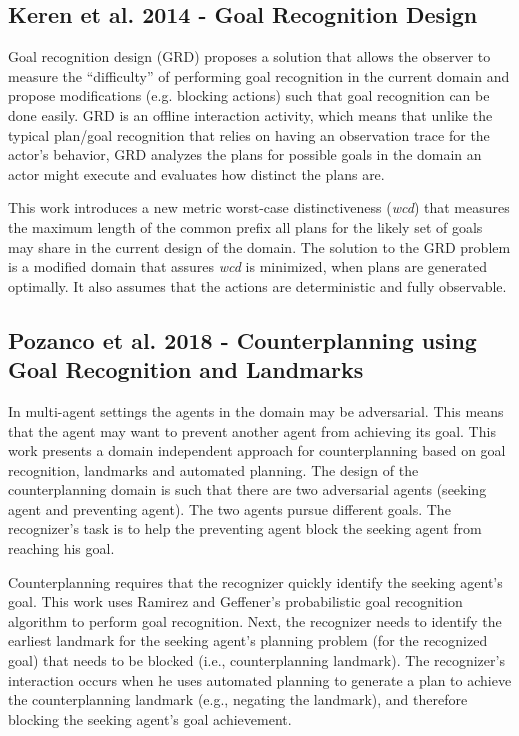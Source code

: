 \subsection{Keren et al. 2014 - Goal Recognition Design}
Goal recognition design (GRD) \cite{keren2014grd} proposes a solution that allows the observer to measure the ``difficulty'' of performing goal recognition in the current domain and propose modifications (e.g. blocking actions) such that goal recognition can be done easily. GRD is an offline interaction activity, which means that unlike the typical plan/goal recognition that relies on having an observation trace for the actor's behavior, GRD analyzes the plans for possible goals in the domain an actor might execute and evaluates how distinct the plans are.

This work introduces a new metric worst-case distinctiveness (\textit{wcd}) that measures the maximum length of the common prefix all plans for the likely set of goals may share in the current design of the domain. The solution to the GRD problem is a modified domain that assures \textit{wcd} is minimized, when plans are generated optimally. It also assumes that the actions are deterministic and fully observable.

\subsection{Pozanco et al. 2018 - Counterplanning using Goal Recognition and Landmarks}
In multi-agent settings the agents in the domain may be adversarial. This means that the agent may want to prevent another agent from achieving its goal. This work presents a domain independent approach for counterplanning based on goal recognition, landmarks and automated planning. The design of the counterplanning domain is such that there are two adversarial agents (seeking agent and preventing agent). The two agents pursue different goals. The recognizer's task is to help the preventing agent block the seeking agent from reaching his goal.

Counterplanning requires that the recognizer quickly identify the seeking agent's goal. This work uses Ramirez and Geffener's probabilistic goal recognition algorithm to perform goal recognition. Next, the recognizer needs to identify the earliest landmark for the seeking agent's planning problem (for the recognized goal) that needs to be blocked (i.e., counterplanning landmark). The recognizer's interaction occurs when he uses automated planning to generate a plan to achieve the counterplanning landmark (e.g., negating the landmark), and therefore blocking the seeking agent's goal achievement.

